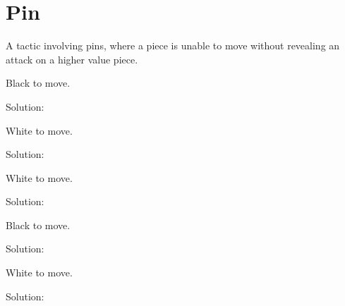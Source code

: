\documentclass{book}
\begin{document}
\section{Pin}
A tactic involving pins, where a piece is unable to move without revealing an attack on a higher value piece.\begin{multicols}{2} 
\begin{samepage} 
\newgame 


 
\showboard
 
 Black to move. 
 
Solution: 
 
\end{samepage}\begin{samepage} 
\newgame 


 
\showboard
 
 White to move. 
 
Solution: 
 
\end{samepage}\begin{samepage} 
\newgame 


 
\showboard
 
 White to move. 
 
Solution: 
 
\end{samepage}\begin{samepage} 
\newgame 


 
\showboard
 
 Black to move. 
 
Solution: 
 
\end{samepage}\begin{samepage} 
\newgame 


 
\showboard
 
 White to move. 
 
Solution: 
 

\end{samepage}
\end{multicols}
\end{document}
